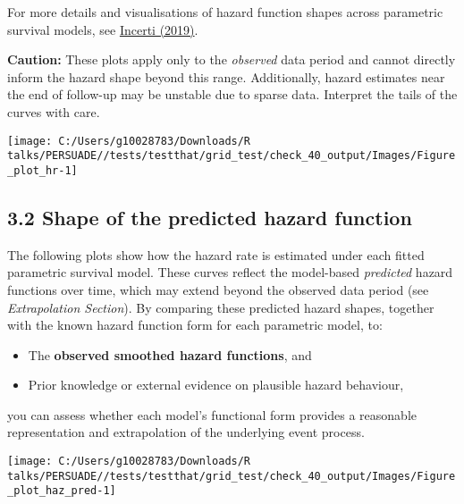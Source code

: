 \documentclass[
]{article}
\providecommand{\tightlist}{%
  \setlength{\itemsep}{0pt}\setlength{\parskip}{0pt}}
\begin{document}
For more details and visualisations of hazard function shapes across
parametric survival models, see
\href{https://devinincerti.com/2019/06/18/parametric_survival.html}{Incerti
(2019)}.

\textbf{Caution:} These plots apply only to the \emph{observed} data
period and cannot directly inform the hazard shape beyond this range.
Additionally, hazard estimates near the end of follow-up may be unstable
due to sparse data. Interpret the tails of the curves with care.

\clearpage

\begin{flushleft}\texttt{[image: C:/Users/g10028783/Downloads/R talks/PERSUADE//tests/testthat/grid\_test/check\_40\_output/Images/Figure\_plot\_hr-1]} \end{flushleft}

\clearpage

\subsection{3.2 Shape of the predicted hazard
function}\label{shape-of-the-predicted-hazard-function}

The following plots show how the hazard rate is estimated under each
fitted parametric survival model. These curves reflect the model-based
\emph{predicted} hazard functions over time, which may extend beyond the
observed data period (see \emph{Extrapolation Section}). By comparing
these predicted hazard shapes, together with the known hazard function
form for each parametric model, to:

\begin{itemize}
\tightlist
\item
  The \textbf{observed smoothed hazard functions}, and\\
\item
  Prior knowledge or external evidence on plausible hazard behaviour,
\end{itemize}

you can assess whether each model's functional form provides a
reasonable representation and extrapolation of the underlying event
process.

\clearpage

\begin{flushleft}\texttt{[image: C:/Users/g10028783/Downloads/R talks/PERSUADE//tests/testthat/grid\_test/check\_40\_output/Images/Figure\_plot\_haz\_pred-1]} \end{flushleft}
\end{document}
